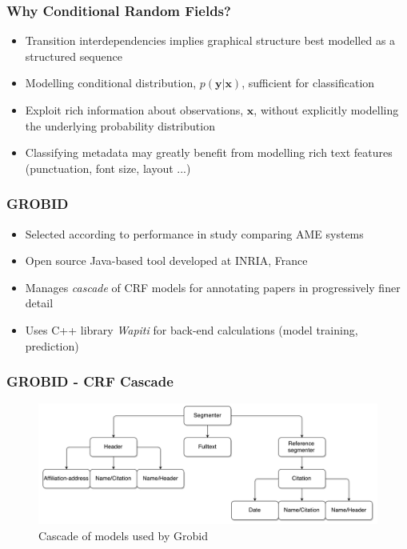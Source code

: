 \documentclass{beamer}
\begin{document}

\begin{frame}
\frametitle{Why Conditional Random Fields?}
\begin{itemize}
\item Transition interdependencies implies graphical structure best modelled as a structured sequence
\item Modelling conditional distribution, $p(\textbf{y}|\textbf{x})$, sufficient for classification
\item Exploit rich information about observations, $\textbf{x}$, without explicitly modelling the underlying probability distribution
\item Classifying metadata may greatly benefit from modelling rich text features (punctuation, font size, layout ...)
\end{itemize}
\end{frame}


\begin{frame}
\frametitle{GROBID}
\begin{itemize}
\item Selected according to performance in study comparing AME systems \cite{
lipinski2013evaluation}
\item Open source Java-based tool developed at INRIA, France
\item Manages \emph{cascade} of CRF models for annotating papers in progressively finer detail
\item Uses C++ library \emph{Wapiti} for back-end calculations (model training, prediction)
\end{itemize}
\end{frame}


\begin{frame}
\frametitle{GROBID - CRF Cascade}
\begin{figure}[h]
\center
\includegraphics[width=\textwidth]{Figures/cascade.pdf}
\caption{Cascade of models used by Grobid}
\end{figure}
\end{frame}
\end{document}
